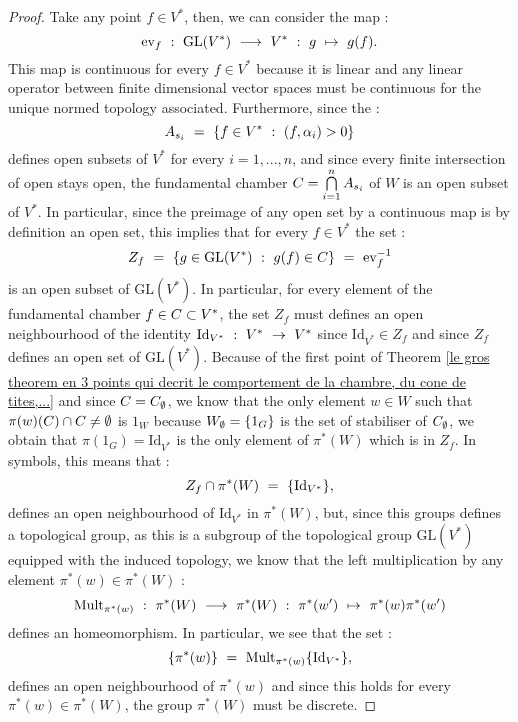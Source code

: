 \begin{proof}
	Take any point $f\in V^*$, then, we can consider the map :
	\begin{equation}
	\mbox{ev}_f\text{ }:\text{ } \mbox{GL}(V^*)\text{ }\longrightarrow\text{ } V^*\text{ } :\text{ } g\text{ } \mapsto\text{ } g(f).
	\end{equation}
	This map is continuous for every $f\in V^*$ because it is linear and any linear operator between finite dimensional vector spaces must be continuous for the unique normed topology associated. Furthermore, since the :
	\begin{equation}
	A_{s_i}\text{ }=\text{ } \{f\in V^*\text{ } :\text{ } (f,\alpha_i)>0\}
	\end{equation}
	defines open subsets of $V^*$ for every $i=1,...,n$, and since every finite intersection of open stays open, the fundamental chamber $C=\bigcap\limits_{i=1}^{n}A_{s_i}$ of $W$ is an open subset of $V^*$. In particular, since the preimage of any open set by a continuous map is by definition an open set, this implies that for every $f\in V^*$ the set :
	\begin{equation}
	Z_f\text{ }=\text{ } \{g\in \mbox{GL}(V^*)\text{ }:\text{ } g(f)\in C\}\text{ }=\text{ } \mbox{ev}_f^{-1}
	\end{equation}
	is an open subset of $\mbox{GL}(V^*)$. In particular, for every element of the fundamental chamber $f \in C\subset V^*$, the set $Z_f$ must defines an open neighbourhood of the identity $\mbox{Id}_{V^*}\text{ }:\text{ } V^*\text{ }\rightarrow\text{ } V^*$ since $\mbox{Id}_{V^*}\in Z_f$ and since $Z_f$ defines an open set of $\mbox{GL}(V^*)$. Because of the first point of Theorem \ref{le gros theorem en 3 points qui decrit le comportement de la chambre, du cone de tites,...} and since $C=C_\emptyset$, we know that the only element $w\in W$ such that $\pi(w)(C)\cap C\not=\emptyset$ is $1_W$ because $W_\emptyset=\{1_G\}$ is the set of stabiliser of $C_\emptyset$, we obtain that $\pi(1_G)=\mbox{Id}_{V^*}$ is the only element of $\pi^*(W)$ which is in $Z_f$. In symbols, this means that :
	\begin{equation}
	Z_f\cap \pi^*(W)\text{ }=\text{ } \{\mbox{Id}_{V^*}\},
	\end{equation}
	defines an open neighbourhood of $\mbox{Id}_{V^*}$ in $\pi^*(W)$, but, since this groups defines a topological group, as this is a subgroup of the topological group $\mbox{GL}(V^*)$ equipped with the induced topology, we know that the left multiplication by any element $\pi^*(w)\in \pi^*(W)$ :
	\begin{equation}
	\mbox{Mult}_{\pi^*(w)}\text{ }:\text{ } \pi^*(W)\text{ }\longrightarrow\text{ } \pi^*(W)\text{ } :\text{ } \pi^*(w')\text{ } \mapsto\text{ } \pi^*(w)\pi^*(w')
	\end{equation}
	defines an homeomorphism. In particular, we see that the set :
	\begin{equation}
	\{\pi^*(w)\}\text{ }=\text{ } \mbox{Mult}_{\pi^*(w)}\{\mbox{Id}_{V^*}\},
	\end{equation}
	defines an open neighbourhood of $\pi^*(w)$ and since this holds for every ${\pi^*(w)}\in \pi^*(W)$, the group $\pi^*(W)$ must be discrete.
\end{proof}
